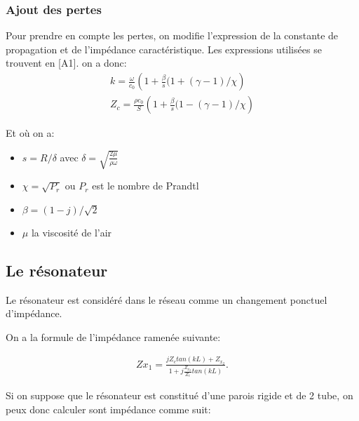 \documentclass[a4paper]{report}
\begin{document}
\subsubsection{Ajout des pertes}

Pour prendre en compte les pertes, on modifie l'expression de la constante de propagation et de l'impédance caractéristique. Les expressions utilisées se trouvent en [A1]. on a donc:
\begin{eqnarray*}
 k =  \frac{\omega}{c_0} \left( 1 + \frac{\beta}{s}(1+(\gamma-1)/ \chi \right) \\
 Z_c =  \frac{\rho c_0}{S} \left( 1 + \frac{\beta}{s}(1-(\gamma-1)/ \chi \right) 
\end{eqnarray*}

Et où on a:
\begin{itemize}
 \item  $s=R/ \delta$ avec $\delta = \sqrt{\frac{2 \mu}{\rho \omega}}$
 \item  $\chi = \sqrt{P_r}$ ou $P_r$ est le nombre de Prandtl
 \item $\beta = (1-j)/\sqrt{2}$ 
 \item $\mu$ la viscosité de l'air
\end{itemize}



\subsection{Le résonateur}
Le résonateur est considéré dans le réseau comme un changement ponctuel d'impédance.

On a la formule de l'impédance ramenée suivante:

\begin{eqnarray}
Z{x_1}=\frac{jZ_c tan(kL)+Z_{x_2}}{1+j\frac{Z_{x_2}}{Z_c}tan(kL)}.
\end{eqnarray}

Si on suppose que le résonateur est constitué d'une parois rigide et de 2 tube, on peux donc calculer sont impédance comme suit:
\end{document}
